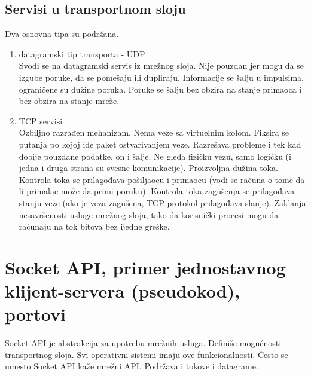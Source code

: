 \documentclass{article} %
\begin{document}
\subsection{Servisi u transportnom sloju}
Dva osnovna tipa su podržana.
\begin{enumerate}
	\item datagramski tip transporta - UDP\\
	Svodi se na datagramski servis iz mrežnog sloja. Nije pouzdan jer mogu da se izgube poruke, da se pomešaju ili dupliraju. Informacije se šalju u impulsima, ograničene su dužine poruka. Poruke se šalju bez obzira na stanje primaoca i bez obzira na stanje mreže.
	\item TCP servisi\\
	Ozbiljno razrađen mehanizam. Nema veze sa virtuelnim kolom. Fiksira se putanja po kojoj ide paket ostvarivanjem veze. Razrešava probleme i tek kad dobije pouzdane podatke, on i šalje. Ne gleda fizičku vezu, samo logičku (i jedna i druga strana su svesne komunikacije). Proizvoljna dužina toka. Kontrola toka se prilagođava pošiljaocu i primaocu (vodi se računa o tome da li primalac može da primi poruku). Kontrola toka zagušenja se prilagođava stanju veze (ako je veza zagušena, TCP protokol prilagođava slanje). Zaklanja nesavršenosti usluge mrežnog sloja, tako da korisnički procesi mogu da računaju na tok bitova bez ijedne greške.
\end{enumerate}

\section{Socket API, primer jednostavnog klijent-servera (pseudokod), portovi}
Socket API je abstrakcija za upotrebu mrežnih usluga. Definiše mogućnosti transportnog sloja. Svi operativni sistemi imaju ove funkcionalnosti. Često se umesto Socket API kaže mrežni API. Podržava i tokove i datagrame.\\
\end{document}
